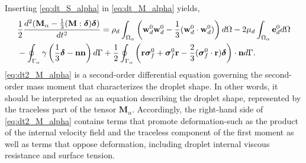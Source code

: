 Inserting \ref{eq:dt_S_alpha} in  \ref{eq:dt_M_alpha} yields,
\begin{align}    
    &\frac{1}{2}\frac{d^2 (\textbf{M}_\alpha-\frac{1}{3}(\textbf{M}:\bm\delta)\bm\delta)}{dt^2}
    =  \rho_d\intO{\left(\textbf{w}_d^0 \textbf{w}_d^0 -\frac{1}{3} (\textbf{w}_d^0 \cdot  \textbf{w}_d^0)\right)}
    - 2\mu_d\intO{\textbf{e}_d^0} \nonumber\\
    &- \intS{\gamma  
        \left( \frac{1}{3}\bm\delta - \textbf{nn} \right)
    }
    + \frac{1}{2}\intS{\left(\textbf{r}\bm\sigma_f^0+\bm\sigma_f^0\textbf{r}-\frac{2}{3}(\bm\sigma_f^0 \cdot \textbf{r})\bm\delta \right)\cdot \textbf{n}}.
    \label{eq:dt2_M_alpha}
\end{align}
\ref{eq:dt2_M_alpha} is a second-order differential equation governing the second-order mass moment that characterizes the droplet shape. 
In other words, it should be interpreted as an equation describing the droplet shape, represented by the traceless part of the tensor $\textbf{M}_\alpha$.
Accordingly, the right-hand side of \ref{eq:dt2_M_alpha} contains terms that promote deformation-such as the product of the internal velocity field and the traceless component of the first moment as well as terms that oppose deformation, including droplet internal viscous resistance and surface tension.

